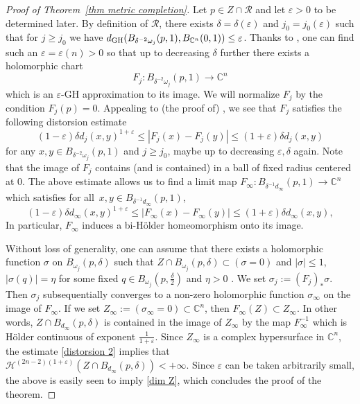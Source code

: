 \documentclass[a4paper,11pt,leqno,english]{smfart}
\theoremstyle{plain}
\theoremstyle{plain}
\numberwithin{equation}{section} %
\numberwithin{figure}{section} %
\theoremstyle{plain}
\theoremstyle{plain}
\theoremstyle{remark}
\theoremstyle{remark}
\theoremstyle{definition}
\theoremstyle{plain}
\theoremstyle{plain}
\theoremstyle{definition}
\newcommand{\C}{{\mathbb{C}}}
\newcommand{\ep}{\varepsilon}
\newcommand{\cR}{\mathcal R}
\renewcommand{\ge}{\geq}
\renewcommand{\le}{\leq}
\begin{document}
\begin{proof}[Proof of Theorem~\ref{thm metric completion}]
Let $p\in Z\cap \cR$ and let $\ep>0$ to be determined later. By definition of $\cR$, there exists $\delta=\delta(\ep)$ and 
$j_0=j_0(\ep)$ such that for $j\ge j_0$ we have $d_{\rm GH}(B_{\delta^{-2}\omega_j}(p,1), B_{\C^n}(0,1))\le \ep$. Thanks to \cite[Theorem~1.4]{LS18}, one can find such an $\ep=\ep(n)>0$ so that up to decreasing $\delta$ 
further there exists a holomorphic chart
\[F_j:B_{\delta^{-2}\omega_j}(p,1)\to \C^n\]
which is an $\ep$-GH approximation to its image. We will normalize $F_j$ by the condition $F_j(p)=0$. Appealing to (the proof of) \cite[Theorem~7.10]{CJN}, we see that $F_j$ satisfies the following distorsion estimate
\begin{equation}
\label{distorsion}
(1-\ep) \delta d_j(x,y)^{1+\ep} \le |F_j(x)-F_j(y)|\le (1+\ep)\delta d_j(x,y)
\end{equation}
for any $x,y\in B_{\delta^{-2}\omega_j}(p,1)$ and $j\ge j_0$, maybe up to decreasing $\ep,\delta$ again. Note that the image of $F_j$ contains (and is contained) in a ball of fixed radius centered at $0$. The above estimate allows us to find a limit map
$F_\infty:B_{\delta^{-1}d_\infty}(p,1)\to \C^n$
which satisfies 
for all $ \, x,y\in B_{\delta^{-1}d_\infty}(p,1)$, 
\begin{equation}
\label{distorsion 2}
(1-\ep) \delta d_\infty(x,y)^{1+\ep} \le |F_\infty(x)-F_\infty(y)|\le (1+\ep)\delta d_\infty(x,y),  
\end{equation}
In particular, $F_\infty$ induces a bi-Hölder homeomorphism onto its image. 

 Without loss of generality, one can assume that there exists a holomorphic function $\sigma$ on $B_{\omega_j}(p,\delta)$ such that $Z \cap B_{\omega_j}(p,\delta)\subset (\sigma=0)$ and $|\sigma|\le 1$, $|\sigma(q)|=\eta$ for some fixed $q\in B_{\omega_j}(p,\frac \delta 2)$ and $\eta>0$ . We set $\sigma_j:=(F_j)_*\sigma$. Then $\sigma_j$ subsequentially converges to a non-zero holomorphic function $\sigma_\infty$ on the image of $F_\infty$. If we set $Z_\infty := (\sigma_\infty=0) \subset \mathbb C^n$, then $F_\infty(Z)\subset Z_\infty$. In other words, $Z\cap B_{d_\infty}(p,\delta)$ is contained in the image of $Z_\infty$ by the map $F^{-1}_\infty$ which is Hölder continuous of exponent $\frac{1}{1+\ep}$. Since $Z_\infty$ is a complex hypersurface in $\mathbb C^n$, the estimate \eqref{distorsion 2} implies that 
$\mathcal H^{(2n-2)(1+\ep)}(Z \cap B_{d_\infty}(p,\delta))<+\infty.$
 Since $\ep$ can be taken arbitrarily small, the above is easily seen to imply \eqref{dim Z}, which concludes the proof of the theorem. 
\end{proof}
\end{document}
